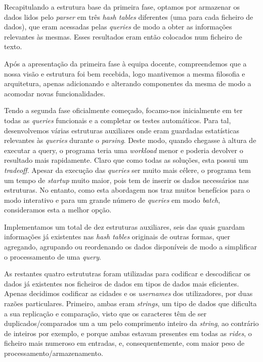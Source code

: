 \documentclass[12pt,a4paper]{report}
\begin{document}
    \par Recapitulando a estrutura base da primeira fase, optamos por armazenar os dados lidos pelo \textit{parser} em três \textit{hash tables} diferentes (uma para cada ficheiro de dados), que eram acessadas pelas \textit{queries} de modo a obter as informações relevantes às mesmas. Esses resultados eram então colocados num ficheiro de texto.
    \par Após a apresentação da primeira fase à equipa docente, compreendemos que a nossa visão e estrutura foi bem recebida, logo mantivemos a mesma filosofia e arquitetura, apenas adicionando e alterando componentes da mesma de modo a acomodar novas funcionalidades. 
    \par Tendo a segunda fase oficialmente começado, focamo-nos inicialmente em ter todas as \textit{queries} funcionais e a completar os testes automáticos. Para tal, desenvolvemos várias estruturas auxiliares onde eram guardadas estatísticas relevantes às \textit{queries} durante o \textit{parsing}. Deste modo, quando chegasse à altura de executar a query, o programa teria uma \textit{workload} menor e poderia devolver o resultado mais rapidamente. Claro que como todas as soluções, esta possui um \textit{tradeoff}. Apesar da execução das \textit{queries} ser muito mais célere, o programa tem um tempo de \textit{startup} muito maior, pois tem de inserir os dados necessários nas estruturas. No entanto, como esta abordagem nos traz muitos benefícios para o modo interativo e para um grande número de \textit{queries} em modo \textit{batch}, consideramos esta a melhor opção.
    \par Implementamos um total de dez estruturas auxiliares, seis das quais guardam informações já existentes nas \textit{hash tables} originais de outras formas, quer agregando, agrupando ou reordenando os dados disponíveis de modo a simplificar o processamento de uma \textit{query}.
    \par As restantes quatro estrututras foram utilizadas para codificar e descodificar os dados já existentes nos ficheiros de dados em tipos de dados mais eficientes. Apenas decidimos codificar as cidades e os \textit{usernames} dos utilizadores, por duas razões particulares. Primeiro, ambas eram \textit{strings}, um tipo de dados que dificulta a sua replicação e comparação, visto que os caracteres têm de ser duplicados/comparados um a um pelo comprimento inteiro da \textit{string}, ao contrário de inteiros por exemplo, e porque ambas estavam presentes em todas as \textit{rides}, o ficheiro mais numeroso em entradas, e, consequentemente, com maior peso de processamento/armazenamento. 
\end{document}
